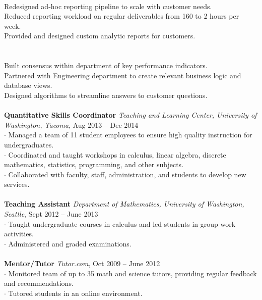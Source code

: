 \documentclass[letterpaper, onecolumn, oneside]{article}
\newcommand{\dotindent}{\hspace*{.25in}$\cdot$ }
\newcommand{\dotindentindent}{\hspace*{.5in}}
\newcommand{\spaceindent}{\hspace*{0.25in}}
\begin{document}
\begin{flushleft}
\spaceindent {\bf Reporting Pipelines} \\
\dotindentindent Redesigned ad-hoc reporting pipeline to scale with customer needs.\\
\dotindentindent Reduced reporting workload on regular deliverables from 160 to 2 hours per week.\\
\dotindentindent Provided and designed custom analytic reports for customers.\\
~\\

\spaceindent {\bf Analytic Infrastructure} \\
\dotindentindent Built consensus within department of key performance indicators.\\
\dotindentindent Partnered with Engineering department to create relevant business logic and database views.\\
\dotindentindent Designed algorithms to streamline answers to customer questions.\\
~\\


\textbf{\large Quantitative Skills Coordinator} \emph{Teaching and Learning Center, University of Washington, Tacoma}, Aug 2013 -- Dec 2014 \\
\dotindent Managed a team of 11 student employees to ensure high quality instruction for undergraduates. \\
\dotindent Coordinated and taught workshops in calculus, linear algebra, discrete mathematics, statistics, programming, and other subjects.\\
\dotindent Collaborated with faculty, staff, administration, and students to develop new services.\\
~\\

\textbf{\large Teaching Assistant} \emph{Department of Mathematics, University of Washington, Seattle}, Sept 2012 -- June 2013 \\
\dotindent Taught undergraduate courses in calculus and led students in group work activities.  \\
\dotindent  Administered and graded examinations.\\
~\\

\textbf{\large Mentor/Tutor} \emph{Tutor.com}, Oct 2009 -- June 2012 \\
\dotindent  Monitored team of up to 35 math and science tutors, providing regular feedback and recommendations.\\
\dotindent  Tutored students in an online environment.\\ 
~\\


\end{flushleft}
\end{document}
